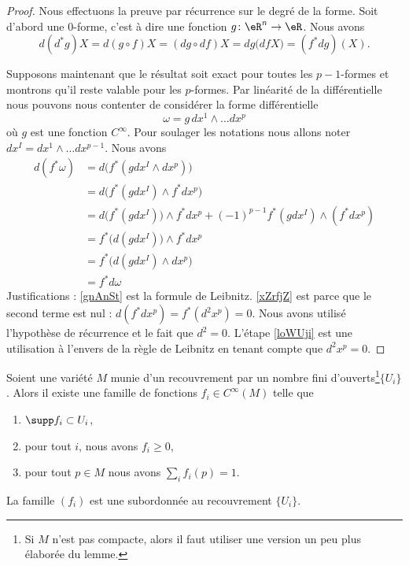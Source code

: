 \begin{proof}
    Nous effectuons la preuve par récurrence sur le degré de la forme. Soit d'abord une \( 0\)-forme, c'est à dire une fonction \( g\colon \eR^n\to \eR\). Nous avons
    \begin{equation}
        d(d^*g)X=d(g\circ f)X=(dg\circ df)X=dg\big( df X \big)=(f^*dg)(X).
    \end{equation}

    Supposons maintenant que le résultat soit exact pour toutes les \( p-1\)-formes et montrons qu'il reste valable pour les \( p\)-formes. Par linéarité de la différentielle nous pouvons nous contenter de considérer la forme différentielle
    \begin{equation}
        \omega=g\,dx^1\wedge\ldots dx^p
    \end{equation}
    où \( g\) est une fonction \(  C^{\infty}\). Pour soulager les notations nous allons noter \( dx^I=dx^1\wedge\ldots dx^{p-1}\). Nous avons
    \begin{subequations}
        \begin{align}
            d(f^*\omega)&=d\big( f^*(gdx^I\wedge dx^p) \big)\\
            &=d\big( f^*(gdx^I)\wedge f^*dx^p \big)\\
            &=d\big( f^*(gdx^I)\big)\wedge f^*dx^p+(-1)^{p-1}f^*(gdx^I)\wedge(f^*dx^p)  \label{gnAnSt}\\
            &=f^*\big( d(gdx^I) \big)\wedge f^*dx^p      \label{xZrfjZ}\\
            &=f^*\big( d(gdx^I)\wedge dx^p \big)\\
            &=f^*d\omega        \label{loWUji}
        \end{align}
    \end{subequations}
    Justifications : \eqref{gnAnSt} est la formule de Leibnitz. \eqref{xZrfjZ} est parce que le second terme est nul : \( d(f^*dx^p)=f^*(d^2x^p)=0\). Nous avons utilisé l'hypothèse de récurrence et le fait que \( d^2=0\). L'étape \eqref{loWUji} est une utilisation à l'envers de la règle de Leibnitz en tenant compte que \( d^2x^p=0\).
\end{proof}


\begin{lemmaDef}   \label{LemGPmRGZ}
    Soient une variété \( M\) munie d'un recouvrement par un nombre fini d'ouverts\footnote{Si \( M\) n'est pas compacte, alors il faut utiliser une version un peu plus élaborée du lemme\cite{SpindelGeomDoff}.}\( \{ U_i \}\). Alors il existe une famille de fonctions \( f_i\in  C^{\infty}(M)\) telle que
    \begin{enumerate}
        \item
            \( \supp f_i\subset U_i\),
        \item
            pour tout \( i\), nous avons \( f_i\geq 0\),
        \item
            pour tout \( p\in M\) nous avons \( \sum_i f_i(p)=1\).
    \end{enumerate}
\end{lemmaDef}
La famille \( (f_i)\) est une  subordonnée au recouvrement \( \{ U_i \}\).

